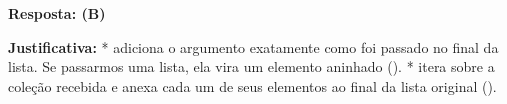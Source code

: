 \ifmostrarGabarito
\textbf{Resposta: (B)}

\textbf{Justificativa:}
*  adiciona o argumento exatamente como foi passado no final da lista. Se passarmos uma lista, ela vira um elemento aninhado (\code{[1, 2, [3, 4]]}).
*  itera sobre a coleção recebida e anexa cada um de seus elementos ao final da lista original (\code{[1, 2, 3, 4]}).

\fi

